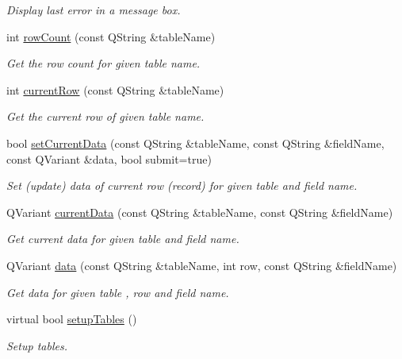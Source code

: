 \begin{DoxyCompactItemize}
\begin{DoxyCompactList}\small\item\em Display last error in a message box. \end{DoxyCompactList}\item 
int \hyperlink{classmdt_sql_form_a7d50c271fc506764ed20dd88914d0ddc}{rowCount} (const QString \&tableName)
\begin{DoxyCompactList}\small\item\em Get the row count for given table name. \end{DoxyCompactList}\item 
int \hyperlink{classmdt_sql_form_a855de08e9ddb3f7898ef4ceb0b0331f9}{currentRow} (const QString \&tableName)
\begin{DoxyCompactList}\small\item\em Get the current row of given table name. \end{DoxyCompactList}\item 
bool \hyperlink{classmdt_sql_form_aa377e70f4a2e865b0b696957c0fca766}{setCurrentData} (const QString \&tableName, const QString \&fieldName, const QVariant \&data, bool submit=true)
\begin{DoxyCompactList}\small\item\em Set (update) data of current row (record) for given table and field name. \end{DoxyCompactList}\item 
QVariant \hyperlink{classmdt_sql_form_aca283557b7e2586779cb5c498d388f14}{currentData} (const QString \&tableName, const QString \&fieldName)
\begin{DoxyCompactList}\small\item\em Get current data for given table and field name. \end{DoxyCompactList}\item 
QVariant \hyperlink{classmdt_sql_form_a0c27d6a9ecbf0589f313c7193c632a62}{data} (const QString \&tableName, int row, const QString \&fieldName)
\begin{DoxyCompactList}\small\item\em Get data for given table , row and field name. \end{DoxyCompactList}\item 
virtual bool \hyperlink{classmdt_sql_form_a27fe6e45aa5d4d7782aad9833e6de20b}{setupTables} ()
\begin{DoxyCompactList}\small\item\em Setup tables. \end{DoxyCompactList}\end{DoxyCompactItemize}
